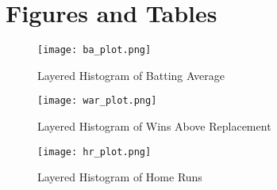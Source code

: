 \documentclass[12pt,english]{article}
\begin{document}
\vfill
\pagebreak{}
\begin{spacing}{1.0}


\end{spacing}

\vfill
\pagebreak{}
\clearpage

\section*{Figures and Tables}\label{sec:figTables}
\begin{figure}[ht]
\centering
\bigskip{}
\texttt{[image: ba\_plot.png]}
\caption{Layered Histogram of Batting Average}
\label{fig:fig1}
\end{figure}

\begin{figure}[ht]
\centering
\bigskip{}
\texttt{[image: war\_plot.png]}
\caption{Layered Histogram of Wins Above Replacement}
\label{fig:fig2}
\end{figure}

\begin{figure}[ht]
\centering
\bigskip{}
\texttt{[image: hr\_plot.png]}
\caption{Layered Histogram of Home Runs}
\label{fig:fig3}
\end{figure}
\end{document}
